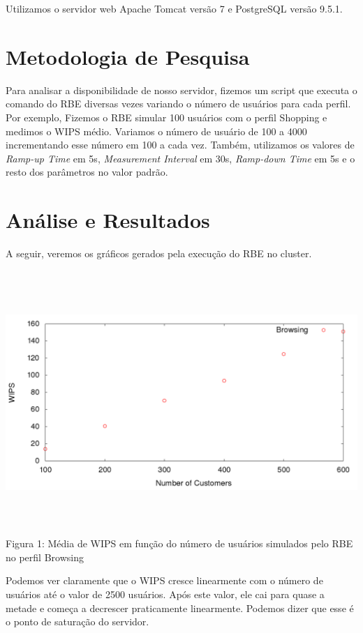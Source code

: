 \documentclass[11pt,twoside]{article}
\begin{document}
	Utilizamos o servidor web Apache Tomcat vers\~ao 7 e PostgreSQL vers\~ao 9.5.1.

\section{Metodologia de Pesquisa}
\setlength{\parindent}{4ex}
Para analisar a disponibilidade de nosso servidor, fizemos um script que executa o comando do RBE diversas vezes variando o n\'umero de usu\'arios para cada perfil. Por exemplo, Fizemos o RBE simular 100 usu\'arios com o perfil Shopping e medimos o WIPS m\'edio. Variamos o n\'umero de usu\'ario de 100 a 4000 incrementando esse n\'umero em 100 a cada vez. Tamb\'em, utilizamos os valores de \textit{Ramp-up Time} em 5s, \textit{Measurement Interval} em 30s, \textit{Ramp-down Time} em 5s e o resto dos par\^ametros no valor padr\~ao.

\section{An\'alise e Resultados}
\setlength{\parindent}{4ex}
A seguir, veremos os gr\'aficos gerados pela execu\c{c}\~ao do RBE no cluster.

\begin{center}
\includegraphics[width=15cm, height=10cm]{images/plot_1_browsing}
Figura 1: M\'edia de WIPS em fun\c{c}\~ao do n\'umero de usu\'arios simulados pelo RBE no perfil Browsing
\end{center}

Podemos ver claramente que o WIPS cresce linearmente com o n\'umero de usu\'arios at\'e o valor de 2500 usu\'arios. Ap\'os este valor, ele cai para quase a metade e come\c{c}a a decrescer praticamente linearmente. Podemos dizer que esse \'e o ponto de satura\c{c}\~ao do servidor.
\end{document}
